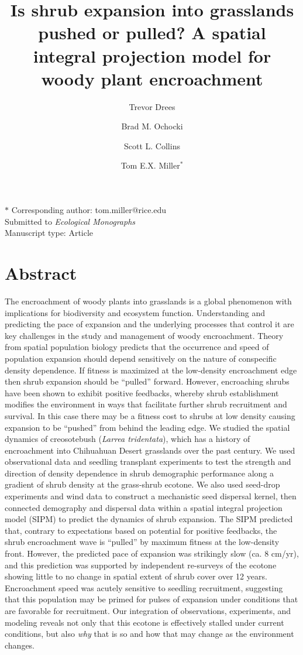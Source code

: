 \documentclass[11pt]{article}\usepackage[]{graphicx}\usepackage[]{color}
\title{Is shrub expansion into grasslands pushed or pulled? A spatial integral projection model for woody plant encroachment}
\author[a]{Trevor Drees}
\author[b]{Brad M. Ochocki}
\author[c]{Scott L. Collins}
\author[b]{Tom E.X. Miller$^{\ast}$}
\affil[a]{Department of Biology, Penn State University, State College, PA USA}
\affil[b]{Program in Ecology and Evolutionary Biology, Department of BioSciences, Rice University, Houston, TX USA}
\affil[c]{Department of Biology, University of New Mexico, Albuquerque, NM USA}
\begin{document}
\maketitle
\noindent{} $\ast$ Corresponding author: tom.miller@rice.edu\\
\noindent{} Submitted to \textit{Ecological Monographs}\\
\noindent{} Manuscript type: Article\\

\linenumbers

\newpage
\section*{Abstract}
The encroachment of woody plants into grasslands is a global phenomenon with implications for biodiversity and ecosystem function. 
Understanding and predicting the pace of expansion and the underlying processes that control it are key challenges in the study and management of woody encroachment.
Theory from spatial population biology predicts that the occurrence and speed of population expansion should depend sensitively on the nature of conspecific density dependence.
If fitness is maximized at the low-density encroachment edge then shrub expansion should be ``pulled'' forward.
However, encroaching shrubs have been shown to exhibit positive feedbacks, whereby shrub establishment modifies the environment in ways that facilitate further shrub recruitment and survival. 
In this case there may be a fitness cost to shrubs at low density causing expansion to be ``pushed'' from behind the leading edge.
We studied the spatial dynamics of creosotebush (\textit{Larrea tridentata}), which has a history of encroachment into Chihuahuan Desert grasslands over the past century.
We used observational data and seedling transplant experiments to test the strength and direction of density dependence in shrub demographic performance along a gradient of shrub density at the grass-shrub ecotone. 
We also used seed-drop experiments and wind data to construct a mechanistic seed dispersal kernel, then connected demography and dispersal data within a spatial integral projection model (SIPM) to predict the dynamics of shrub expansion.
The SIPM predicted that, contrary to expectations based on potential for positive feedbacks, the shrub encroachment wave is ``pulled'' by maximum fitness at the low-density front.
However, the predicted pace of expansion was strikingly slow (ca. 8 cm/yr), and this prediction was supported by independent re-surveys of the ecotone showing little to no change in spatial extent of shrub cover over 12 years. 
Encroachment speed was acutely sensitive to seedling recruitment, suggesting that this population may be primed for pulses of expansion under conditions that are favorable for recruitment.
Our integration of observations, experiments, and modeling reveals not only that this ecotone is effectively stalled under current conditions, but also \emph{why} that is so and how that may change as the environment changes. 
\end{document}
